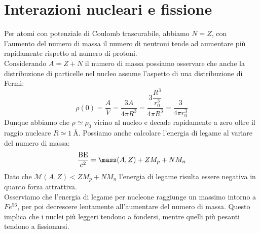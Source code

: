 \section{Interazioni nucleari e fissione}
Per atomi con potenziale di Coulomb trascurabile, abbiamo $N=Z$, con l'aumento del numero di massa il numero di neutroni tende ad aumentare più rapidamente rispetto al numero di protoni.\\
Considerando $A = Z+N$ il numero di massa possiamo osservare che anche la distribuzione di particelle nel nucleo assume l'aspetto di una distribuzione di Fermi:
\begin{equation}
 \rho(0) = \dfrac{A}{V} = \dfrac{3A}{4 \pi R^3} = \dfrac{3\dfrac{R^3}{r_0^3}}{4 \pi R^3} = \dfrac{3}{4 \pi r_0^3}
\end{equation}
Dunque abbiamo che $\rho \simeq \rho_0$ vicino al nucleo e decade rapidamente a zero oltre il raggio nucleare $R \simeq \qty{1}{\angstrom} $.
Possiamo anche calcolare l'energia di legame al variare del numero di massa:
\begin{equation}
 \dfrac{\text{BE}}{c^2} = \mass(A,Z) + ZM_p + N M_n
\end{equation}
Dato che $\mathcal{M}(A,Z) < ZM_p + N M_n$ l'energia di legame risulta essere negativa in quanto forza attrattiva.\\
Osserviamo che l'energia di legame per nucleone raggiunge un massimo intorno a $Fe^{56}$, per poi decrescere lentamente all'aumentare del numero di massa. Questo implica che i nuclei più leggeri tendono a fondersi, mentre quelli più pesanti tendono a fissionarsi.


